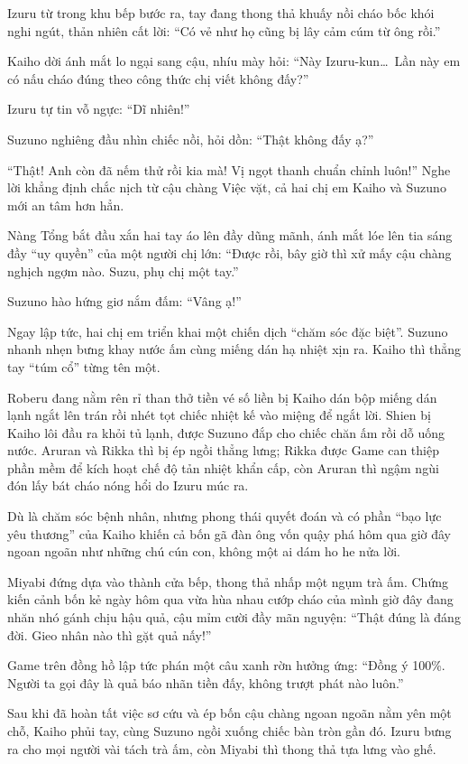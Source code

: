 \documentclass[../main.tex]{subfiles}
\begin{document}
Izuru từ trong khu bếp bước ra, tay đang thong thả khuấy nồi cháo bốc khói nghi ngút, thản nhiên cất lời: ``Có vẻ như họ cũng bị lây cảm cúm từ ông rồi.''

Kaiho dời ánh mắt lo ngại sang cậu, nhíu mày hỏi: ``Này Izuru-kun\dots\ Lần này em có nấu cháo đúng theo công thức chị viết không đấy?''

Izuru tự tin vỗ ngực: ``Dĩ nhiên!''

Suzuno nghiêng đầu nhìn chiếc nồi, hỏi dồn: ``Thật không đấy ạ?''

``Thật! Anh còn đã nếm thử rồi kia mà! Vị ngọt thanh chuẩn chỉnh luôn!'' Nghe lời khẳng định chắc nịch từ cậu chàng Việc vặt, cả hai chị em Kaiho và Suzuno mới an tâm hơn hẳn.

Nàng Tổng bắt đầu xắn hai tay áo lên đầy dũng mãnh, ánh mắt lóe lên tia sáng đầy ``uy quyền'' của một người chị lớn: ``Được rồi, bây giờ thì xử mấy cậu chàng nghịch ngợm nào. Suzu, phụ chị một tay.''

Suzuno hào hứng giơ nắm đấm: ``Vâng ạ!''

Ngay lập tức, hai chị em triển khai một chiến dịch ``chăm sóc đặc biệt''. Suzuno nhanh nhẹn bưng khay nước ấm cùng miếng dán hạ nhiệt xịn ra. Kaiho thì thẳng tay ``túm cổ'' từng tên một.

Roberu đang nằm rên rỉ than thở tiền vé số liền bị Kaiho dán bộp miếng dán lạnh ngắt lên trán rồi nhét tọt chiếc nhiệt kế vào miệng để ngắt lời. Shien bị Kaiho lôi đầu ra khỏi tủ lạnh, được Suzuno đắp cho chiếc chăn ấm rồi dỗ uống nước. Aruran và Rikka thì bị ép ngồi thẳng lưng; Rikka được Game can thiệp phần mềm để kích hoạt chế độ tản nhiệt khẩn cấp, còn Aruran thì ngậm ngùi đón lấy bát cháo nóng hổi do Izuru múc ra.

Dù là chăm sóc bệnh nhân, nhưng phong thái quyết đoán và có phần ``bạo lực yêu thương'' của Kaiho khiến cả bốn gã đàn ông vốn quậy phá hôm qua giờ đây ngoan ngoãn như những chú cún con, không một ai dám ho he nửa lời.

Miyabi đứng dựa vào thành cửa bếp, thong thả nhấp một ngụm trà ấm. Chứng kiến cảnh bốn kẻ ngày hôm qua vừa hùa nhau cướp cháo của mình giờ đây đang nhăn nhó gánh chịu hậu quả, cậu mỉm cười đầy mãn nguyện: ``Thật đúng là đáng đời. Gieo nhân nào thì gặt quả nấy!''

Game trên đồng hồ lập tức phán một câu xanh rờn hưởng ứng: ``Đồng ý 100\%. Người ta gọi đây là quả báo nhãn tiền đấy, không trượt phát nào luôn.''

\ct

Sau khi đã hoàn tất việc sơ cứu và ép bốn cậu chàng ngoan ngoãn nằm yên một chỗ, Kaiho phủi tay, cùng Suzuno ngồi xuống chiếc bàn tròn gần đó. Izuru bưng ra cho mọi người vài tách trà ấm, còn Miyabi thì thong thả tựa lưng vào ghế.
\end{document}
